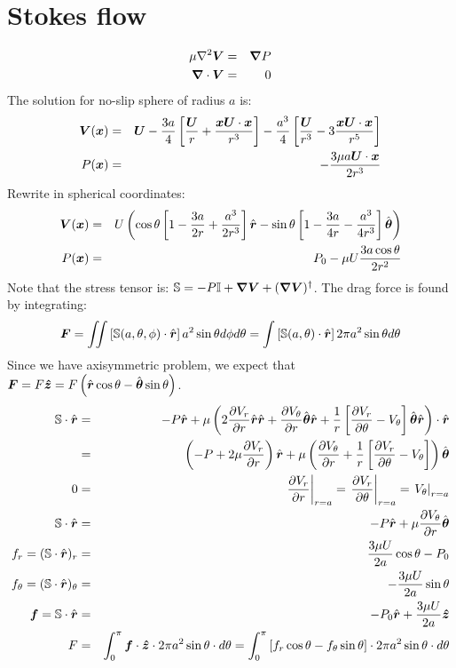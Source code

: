 \documentclass[11pt]{article}
\begin{document}
\section{Stokes flow}
\begin{eqnarray}
\mu \nabla^2 \boldsymbol{V} &=& \boldsymbol{\nabla} P \\
\boldsymbol{\nabla} \cdot \boldsymbol{V} &=& 0
\end{eqnarray}
The solution for no-slip sphere of radius $a$ is:
\begin{eqnarray}
\boldsymbol{V}(\boldsymbol{x}) &=& \mathscr{\boldsymbol{U}} -
\frac{3a}{4} \left[ \frac{\mathscr{\boldsymbol{U}}}{r} + \frac{\boldsymbol{x} \mathscr{\boldsymbol{U}} \cdot \boldsymbol{x}}{r^3} \right] -
\frac{a^3}{4} \left[ \frac{\mathscr{\boldsymbol{U}}}{r^3} - 3\frac{\boldsymbol{x} \mathscr{\boldsymbol{U}} \cdot \boldsymbol{x}}{r^5} \right] \\
P(\boldsymbol{x}) &=& -\frac{3\mu a \mathscr{\boldsymbol{U}} \cdot \boldsymbol{x}}{2r^3}
\end{eqnarray}
Rewrite in spherical coordinates:
\begin{eqnarray}
\boldsymbol{V}(\boldsymbol{x}) &=& U \left(
\cos\theta \left[1 - \frac{3a}{2r} + \frac{a^3}{2r^3}\right] \hat{\boldsymbol{r}} -
\sin\theta \left[1 - \frac{3a}{4r} - \frac{a^3}{4r^3}\right] \hat{\boldsymbol{\theta}}
\right) \\
P(\boldsymbol{x}) &=& P_0 -\mu U \frac{3a \cos\theta}{2r^2}
\end{eqnarray}
Note that the stress tensor is:
$\mathbb{S} = -P \mathbb{I} + \boldsymbol{\nabla} \boldsymbol{V} + (\boldsymbol{\nabla} \boldsymbol{V})^\dagger$.
The drag force is found by integrating:
\begin{eqnarray}
\boldsymbol{F} = \iint{\left[\mathbb{S}(a,\theta, \phi) \cdot \hat{\boldsymbol{r}}\right] a^2 \sin\theta d\phi d\theta} =
\int{\left[\mathbb{S}(a,\theta) \cdot \hat{\boldsymbol{r}}\right] 2 \pi a^2 \sin\theta d\theta}
\end{eqnarray}
Since we have axisymmetric problem, we expect that
$\boldsymbol{F} = F \boldsymbol{\hat{z}} = F \left(\hat{\boldsymbol{r}} \cos\theta - \hat{\boldsymbol{\theta}} \sin\theta\right)$.
\begin{eqnarray}
\mathbb{S} \cdot \hat{\boldsymbol{r}} &=& -P \hat{\boldsymbol{r}} + \mu \left(
2\frac{\partial V_r}{\partial r}\hat{\boldsymbol{r}}\hat{\boldsymbol{r}} + \frac{\partial V_\theta}{\partial r}\hat{\boldsymbol{\theta}}\hat{\boldsymbol{r}} +
\frac{1}{r}\left[\frac{\partial V_r}{\partial \theta} - V_\theta \right]\hat{\boldsymbol{\theta}}\hat{\boldsymbol{r}}
\right) \cdot \hat{\boldsymbol{r}} \\
&=& \left(-P + 2\mu \frac{\partial V_r}{\partial r}\right)\hat{\boldsymbol{r}}
+ \mu \left(\frac{\partial V_\theta}{\partial r} + \frac{1}{r}\left[\frac{\partial V_r}{\partial \theta} -
V_\theta \right]\right)\hat{\boldsymbol{\theta}} \\
0 &=& \left.\frac{\partial V_r}{\partial r}\right|_{r=a} =
\left.\frac{\partial V_r}{\partial \theta}\right|_{r=a} =
\left.V_\theta\right|_{r=a} \\
\mathbb{S} \cdot \hat{\boldsymbol{r}} &=&
-P\hat{\boldsymbol{r}} + \mu \frac{\partial V_\theta}{\partial r}\hat{\boldsymbol{\theta}} \\
f_r = (\mathbb{S} \cdot \hat{\boldsymbol{r}})_r &=& \frac{3 \mu U}{2a} \cos\theta - P_0 \\
f_\theta = (\mathbb{S} \cdot \hat{\boldsymbol{r}})_\theta &=& -\frac{3\mu U}{2a} \sin\theta \\
\boldsymbol{f} = \mathbb{S} \cdot \hat{\boldsymbol{r}} &=& -P_0 \hat{\boldsymbol{r}} + \frac{3\mu U}{2a} \boldsymbol{\hat{z}} \\
F &=&
\int_0^\pi \boldsymbol{f} \cdot \boldsymbol{\hat{z}} \cdot 2\pi a^2 \sin\theta \cdot d\theta =
\int_0^\pi \left[f_r \cos\theta - f_\theta \sin\theta\right] \cdot 2\pi a^2 \sin\theta \cdot d\theta
\end{eqnarray}
\end{document}
